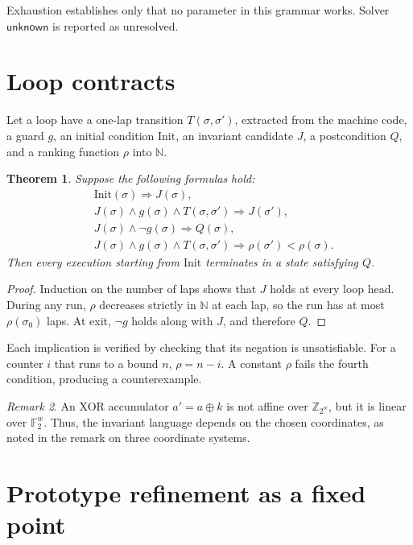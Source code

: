 \documentclass[11pt]{article}
\newtheorem{theorem}{Theorem}[section]
\theoremstyle{definition}
\theoremstyle{remark}
\newtheorem{remark}[theorem]{Remark}
\newcommand{\Z}{\mathbb{Z}}
\newcommand{\N}{\mathbb{N}}
\newcommand{\F}{\mathbb{F}}
\begin{document}
Exhaustion establishes only that no parameter in this grammar works. Solver $\mathsf{unknown}$ is reported as unresolved.

\section{Loop contracts}

Let a loop have a one-lap transition $T(\sigma, \sigma')$, extracted from the machine code, a guard $g$, an initial condition $\mathrm{Init}$, an invariant candidate $J$, a postcondition $Q$, and a ranking function $\rho$ into $\N$.

\begin{theorem}
Suppose the following formulas hold:
\begin{align*}
  &\mathrm{Init}(\sigma) \Rightarrow J(\sigma), \\
  &J(\sigma) \wedge g(\sigma) \wedge T(\sigma,\sigma') \Rightarrow J(\sigma'), \\
  &J(\sigma) \wedge \neg g(\sigma) \Rightarrow Q(\sigma), \\
  &J(\sigma) \wedge g(\sigma) \wedge T(\sigma,\sigma') \Rightarrow \rho(\sigma') < \rho(\sigma).
\end{align*}
Then every execution starting from $\mathrm{Init}$ terminates in a state satisfying $Q$.
\end{theorem}

\begin{proof}
Induction on the number of laps shows that $J$ holds at every loop head. During any run, $\rho$ decreases strictly in $\N$ at each lap, so the run has at most $\rho(\sigma_0)$ laps. At exit, $\neg g$ holds along with $J$, and therefore $Q$.
\end{proof}

Each implication is verified by checking that its negation is unsatisfiable. For a counter $i$ that runs to a bound $n$, $\rho = n - i$. A constant $\rho$ fails the fourth condition, producing a counterexample.

\begin{remark}
An XOR accumulator $a' = a \oplus k$ is not affine over $\Z_{2^w}$, but it is linear over $\F_2^w$. Thus, the invariant language depends on the chosen coordinates, as noted in the remark on three coordinate systems.
\end{remark}

\section{Prototype refinement as a fixed point}
\end{document}

